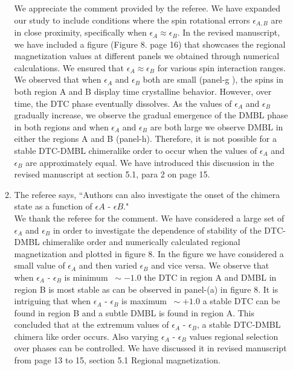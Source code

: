 \documentclass[aps,prb,reprint,showpacs,floatfix,superscriptaddress, onecolumn, nofootinbib, 10pt]{revtex4-2}
\newcommand{\response}[1]{{\color{black}#1}} %
\newcommand{\comment}[1]{{\color{blue}#1}} %
\begin{document}
\begin{enumerate}
\begin{enumerate}
		\response{	
		We appreciate the comment provided by the referee. We have expanded our study to include conditions where the spin rotational errors $\epsilon_{A,B}$ are in close proximity, specifically when $\epsilon_A \approx \epsilon_B$. In the revised manuscript, we have included a figure (Figure 8. page 16) that showcases the regional magnetization values at different panels we obtained through numerical calculations. We ensured that $\epsilon_A \approx \epsilon_B$ for various spin interaction ranges. We observed that when $\epsilon_A$ and $\epsilon_B$ both are small (panel-g ), the spins in both region A and B display time crystalline behavior. However, over time, the DTC phase eventually dissolves. As the values of $\epsilon_A$ and $\epsilon_B$ gradually increase, we observe the gradual emergence of the DMBL phase in both regions and when $\epsilon_A$ and $\epsilon_B$ are both large we observe DMBL in either  the regions A and B (panel-h). Therefore, it is not possible for a stable DTC-DMBL chimeralike order to occur when the values of $\epsilon_A$ and $\epsilon_B$ are approximately equal. We have introduced this discussion in the revised manuscript at section 5.1, para 2 on page 15.
		}\\
	
		\item The referee says, \comment{``Authors can also investigate the onset of the chimera state as a function of $\epsilon A$ - $\epsilon B$."}\\
		
		\response{We thank the referee for the comment. We have considered a large set of $\epsilon_A$ and $\epsilon_B$ in order to investigate the dependence of stability of the DTC-DMBL chimeralike order and numerically calculated regional magnetization and plotted in figure 8. In the figure we have considered a small value of $\epsilon_A$ and then varied $\epsilon_B$ and vice versa. We observe that when $\epsilon_A$ - $\epsilon_B$ is minimum $~\sim -1.0$ the DTC in region A and DMBL in region B is most stable as can be observed in panel-(a) in figure 8. It is intriguing that when   $\epsilon_A$ - $\epsilon_B$ is maximum $~\sim +1.0$ a stable DTC can be found in region B and a subtle DMBL is found in region A. This concluded that at the extremum values of  $\epsilon_A$ - $\epsilon_B$, a stable DTC-DMBL chimera like order occurs. Also varying $\epsilon_A$ - $\epsilon_B$ values regional selection over phases can be controlled. We have discussed it in revised manuscript from page 13 to 15, section 5.1 Regional magnetization. }
		

\end{enumerate}
\end{enumerate}
\end{document}
